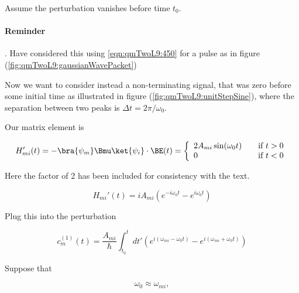 Assume the perturbation vanishes before time $t_0$.

\paragraph{Reminder}.  Have considered this using \ref{eqn:qmTwoL9:450} for a pulse as in figure (\ref{fig:qmTwoL9:gaussianWavePacket})


Now we want to consider instead a non-terminating signal, that was zero before some initial time as illustrated in figure (\ref{fig:qmTwoL9:unitStepSine}), where the separation between two peaks is $\Delta t = 2\pi/\omega_0$.


Our matrix element is 

\begin{equation}\label{eqn:qmTwoL9:470}
H_{mi}'(t) = - \bra{\psi_m} \Bmu \ket{\psi_i} \cdot \BE(t) = 
\left\{
\begin{array}{l l}
2 A_{mi} \sin(\omega_0 t) & \quad \mbox{if $t > 0$} \\
0 & \quad \mbox{if $t < 0$} \\
\end{array}
\right.
\end{equation}

Here the factor of 2 has been included for consistency with the text.

\begin{equation}\label{eqn:qmTwoL9:490}
H_{mi}'(t) = i A_{mi} 
\left( 
e^{-i \omega_0 t}
-e^{i \omega_0 t} 
\right)
\end{equation}

Plug this into the perturbation

\begin{equation}\label{eqn:qmTwoL9:510}
c_m^{(1)}(t) = 
\frac{A_{mi}}{\hbar} \int_{t_0}^t dt' 
\left( 
e^{i (\omega_{mi} - \omega_0 t) }
-e^{i (\omega_{mi} + \omega_0 t) }
\right)
\end{equation}


Suppose that

\begin{equation}\label{eqn:qmTwoL9:530}
\omega_0 \approx \omega_{mi},
\end{equation}

